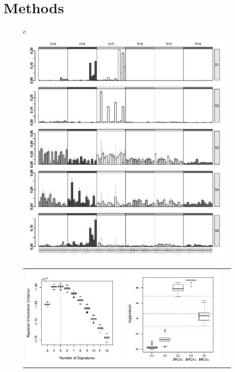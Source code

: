 \documentclass{bioinfo}
\begin{document}
\section{Methods}
\begin{figure}[htb!]
 \centering
 \begin{tabular}{c}
  \includegraphics[width=14cm]{figs/Signatures_5_com_Opp_bw} 
  \\
  \begin{tabular}{ccc}
   \includegraphics[width=5.5cm]{figs/BICs_21bc_with_Opportunity_5_3to12}
   &
   \includegraphics[width=5.5cm]{figs/Diffexp_boxplot_21bc_com_Opp_bw3}

\end{tabular}
\end{tabular}
\end{figure}
\end{document}
